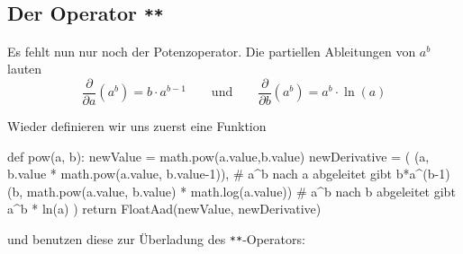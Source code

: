 \documentclass[
  a4paper,
  DIV=11]{scrreprt}
\newenvironment{Shaded}{\begin{snugshade}}{\end{snugshade}}
\newcommand{\BuiltInTok}[1]{\textcolor[rgb]{0.00,0.23,0.31}{#1}}
\newcommand{\CommentTok}[1]{\textcolor[rgb]{0.37,0.37,0.37}{#1}}
\newcommand{\ControlFlowTok}[1]{\textcolor[rgb]{0.00,0.23,0.31}{#1}}
\newcommand{\DecValTok}[1]{\textcolor[rgb]{0.68,0.00,0.00}{#1}}
\newcommand{\KeywordTok}[1]{\textcolor[rgb]{0.00,0.23,0.31}{#1}}
\newcommand{\NormalTok}[1]{\textcolor[rgb]{0.00,0.23,0.31}{#1}}
\newcommand{\OperatorTok}[1]{\textcolor[rgb]{0.37,0.37,0.37}{#1}}
\theoremstyle{definition}
\theoremstyle{definition}
\theoremstyle{remark}
\begin{document}
\begin{tcolorbox}
\end{tcolorbox}

\hypertarget{der-operator}{%
\subsection{\texorpdfstring{Der Operator
\texttt{**}}{Der Operator **}}\label{der-operator}}

Es fehlt nun nur noch der Potenzoperator. Die partiellen Ableitungen von
\(a^b\) lauten \[
\frac{\partial}{\partial a}(a^b)=b\cdot a^{b-1} \qquad\textrm{und}\qquad \frac{\partial}{\partial b}(a^b)=a^b \cdot \ln(a)
\]

Wieder definieren wir uns zuerst eine Funktion

\begin{Shaded}
\begin{Highlighting}[]
\KeywordTok{def} \BuiltInTok{pow}\NormalTok{(a, b):}
\NormalTok{    newValue }\OperatorTok{=}\NormalTok{ math.}\BuiltInTok{pow}\NormalTok{(a.value,b.value)}
\NormalTok{    newDerivative }\OperatorTok{=}\NormalTok{ (}
\NormalTok{        (a, b.value }\OperatorTok{*}\NormalTok{ math.}\BuiltInTok{pow}\NormalTok{(a.value, b.value}\OperatorTok{{-}}\DecValTok{1}\NormalTok{)), }\CommentTok{\# a\^{}b nach a abgeleitet gibt b*a\^{}(b{-}1)}
\NormalTok{        (b, math.}\BuiltInTok{pow}\NormalTok{(a.value, b.value) }\OperatorTok{*}\NormalTok{ math.log(a.value))  }\CommentTok{\# a\^{}b nach b abgeleitet gibt a\^{}b * ln(a)}
\NormalTok{    )}
    \ControlFlowTok{return}\NormalTok{ FloatAad(newValue, newDerivative)}
\end{Highlighting}
\end{Shaded}

und benutzen diese zur Überladung des \texttt{**}-Operators:
\end{document}
